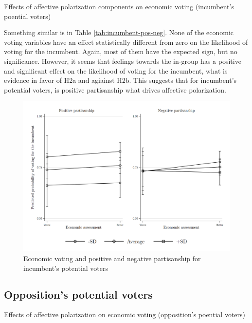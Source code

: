\documentclass[a4paper, svgnames]{article}
\begin{document}
\begin{table}[H]
	\label{inc-pos-neg}
	\centering
	\caption{\label{tab:incumbent-pos-neg} Effects of affective polarization components on economic voting (incumbent's poential voters)}
	

\end{table}

Something similar is in Table \ref{tab:incumbent-pos-neg}. None of the economic voting variables have an effect statistically different from zero on the likelihood of voting for the incumbent. Again, most of them have the expected sign, but no significance. However, it seems that feelings towards the in-group has a positive and significant effect on the likelihood of voting for the incumbent, what is evidence in favor of H2a and agiainst H2b. This suggests that for incumbent's potential voters, is positive partisanship what drives affective polarization.

\begin{figure}[H]
	\centering
	\includegraphics[width=\textwidth]{Figures/pos-neg.png}
	\caption{\label{fig:pos-neg-inc-margins} Economic voting and positive and negative partisanship for incumbent's potential voters}
\end{figure}


\subsection{Opposition's potential voters}

\begin{table}[H]
	\centering
	\caption{\label{tab:opposition} Effects of affective polarization on economic voting (opposition's poential voters)}
	

\end{table}
\end{document}
